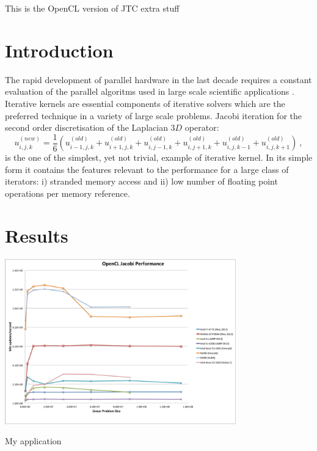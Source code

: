This is the Open\-C\-L version of J\-T\-C extra stuff \hypertarget{index_Introduction}{}\section{Introduction}\label{index_Introduction}
The rapid development of parallel hardware in the last decade requires a constant evaluation of the parallel algoritms used in large scale scientific applications . Iterative kernels are essential components of iterative solvers which are the preferred technique in a variety of large scale problems. Jacobi iteration for the second order discretisation of the Laplacian $ 3D$ operator\-: \begin{equation} u^{(new)}_{i,j,k}=\frac{1}{6}(u^{(old)}_{i-1,j,k}+ u^{(old)}_{i+1,j,k}+u^{(old)}_{i,j-1,k}+ u^{(old)}_{i,j+1,k}+u^{(old)}_{i,j,k-1}+u^{(old)}_{i,j,k+1}) \ , \end{equation} is the one of the simplest, yet not trivial, example of iterative kernel. In its simple form it contains the features relevant to the performance for a large class of iterators\-: i) stranded memory access and ii) low number of floating point operations per memory reference. \hypertarget{index_Results}{}\section{Results}\label{index_Results}

\begin{DoxyImage}
\includegraphics[width=10cm]{OPENCLRESULTS}
\caption{My application}
\end{DoxyImage}
 